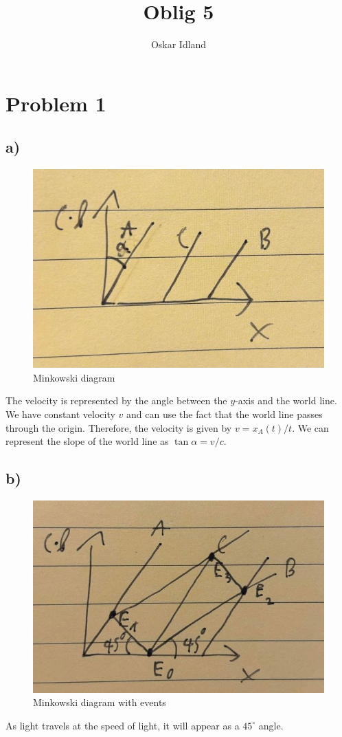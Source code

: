 \documentclass{article}
\author{Oskar Idland}
\title{Oblig 5}
\date{}
\begin{document}
\maketitle
\newpage
\section*{Problem 1}
\subsection*{a)}
\begin{figure}[h!]
\centering
\includegraphics[width = \textwidth]{1a.jpg}
\caption{Minkowski diagram}
\label{fig: 1a}
\end{figure}

The velocity is represented by the angle between the $y$-axis and the world line. We have constant velocity $v$ and can use the fact that the world line passes through the origin. Therefore, the velocity is given by $v = x_{A}(t) / t$. We can represent the slope of the world line as $\tan α = v / c$. 

\subsection*{b)}
\begin{figure}[h!]
\centering
\includegraphics[width = \textwidth]{1b.jpg}
\caption{Minkowski diagram with events} 
\label{fig: 1b}
\end{figure}
As light travels at the speed of light, it will appear as a $45^{∘}$ angle. 
\end{document}
